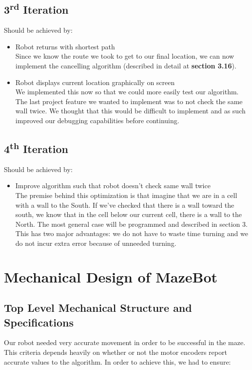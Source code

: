 \documentclass[11pt]{article}
\newcommand{\ts}{\textsuperscript}
\begin{document}
\subsection{3\ts{rd} Iteration}

Should be achieved by:
\begin{itemize}
\item Robot returns with shortest path\\
Since we know the route we took to get to our final location, we can now implement the cancelling algorithm (described in detail at \textbf{section 3.16}).
\item Robot displays current location graphically on screen\\
We implemented this now so that we could more easily test our algorithm. The last project feature we wanted to implement was to not check the same wall twice. We thought that this would be difficult to implement and as such improved our debugging capabilities before continuing.
\end{itemize}

\subsection{4\ts{th} Iteration}
Should be achieved by:

\begin{itemize}
\item Improve algorithm such that robot doesn't check same wall twice\\
The premise behind this optimization is that imagine that we are in a cell with a wall to the South. If we've checked that there is a wall toward the south, we know that in the cell below our current cell, there is a wall to the North. The most general case will be programmed and described in section 3. This has two major advantages: we do not have to waste time turning and we do not incur extra error because of unneeded turning.
\end{itemize}

\newpage
\section{Mechanical Design of MazeBot}
\subsection{Top Level Mechanical Structure and Specifications}
Our robot needed very accurate movement in order to be successful in the maze. This criteria depends heavily on whether or not the motor encoders report accurate values to the algorithm. In order to achieve this, we had to ensure:
\end{document}
